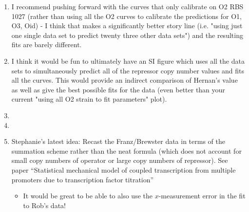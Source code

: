 \begin{enumerate}
	\item I recommend pushing forward with the curves that only calibrate on O2 RBS 1027 (rather than using all the O2 curves to calibrate the predictions for O1, O3, Oid) - I think that makes a significantly better story line (i.e. "using just one single data set to predict twenty three other data sets") and the resulting fits are barely different.
	
	\item I think it would be fun to ultimately have an SI figure which uses all the data sets to simultaneously predict all of the repressor copy number values and fits all the curves. This would provide an indirect comparison of Hernan's value as well as give the best possible fits for the data (even better than your current "using all O2 strain to fit parameters" plot).
	
	\item {}
	
	\item {}
	
	\item Stephanie's latest idea: Recast the Franz/Brewster data in terms of the
	summation scheme rather than the neat formula (which does not account for small
	copy numbers of operator or large copy numbers of repressor). See paper
	``Statistical mechanical model of coupled transcription from multiple promoters
	due to transcription factor titration'' \begin{itemize} \item It would be great
		to be able to also use the $x$-measurement error in the fit to Rob's data!
	\end{itemize}
	

\end{enumerate}

